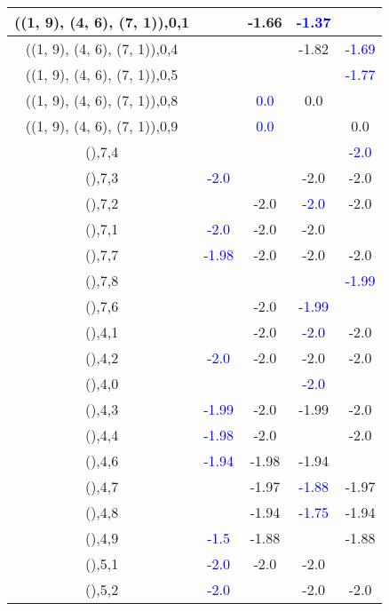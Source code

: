 \documentclass{article}
\begin{document}
\begin{center}
\begin{longtable}{|c|c|c|c|c|}
        	\hline
        	((1, 9), (4, 6), (7, 1)),0,1&&-1.66& \textcolor{blue}{-1.37}&\\
        	\hline
        	((1, 9), (4, 6), (7, 1)),0,4&&&-1.82& \textcolor{blue}{-1.69}\\
        	\hline
        	((1, 9), (4, 6), (7, 1)),0,5&&&& \textcolor{blue}{-1.77}\\
        	\hline
        	((1, 9), (4, 6), (7, 1)),0,8&& \textcolor{blue}{0.0}&0.0&\\
        	\hline
        	((1, 9), (4, 6), (7, 1)),0,9&& \textcolor{blue}{0.0}&&0.0\\
        	\hline
        	(),7,4&&&& \textcolor{blue}{-2.0}\\
        	\hline
        	(),7,3& \textcolor{blue}{-2.0}&&-2.0&-2.0\\
        	\hline
        	(),7,2&&-2.0& \textcolor{blue}{-2.0}&-2.0\\
        	\hline
        	(),7,1& \textcolor{blue}{-2.0}&-2.0&-2.0&\\
        	\hline
        	(),7,7& \textcolor{blue}{-1.98}&-2.0&-2.0&-2.0\\
        	\hline
        	(),7,8&&&& \textcolor{blue}{-1.99}\\
        	\hline
        	(),7,6&&-2.0& \textcolor{blue}{-1.99}&\\
        	\hline
        	(),4,1&&-2.0& \textcolor{blue}{-2.0}&-2.0\\
        	\hline
        	(),4,2& \textcolor{blue}{-2.0}&-2.0&-2.0&-2.0\\
        	\hline
        	(),4,0&&& \textcolor{blue}{-2.0}&\\
        	\hline
        	(),4,3& \textcolor{blue}{-1.99}&-2.0&-1.99&-2.0\\
        	\hline
        	(),4,4& \textcolor{blue}{-1.98}&-2.0&&-2.0\\
        	\hline
        	(),4,6& \textcolor{blue}{-1.94}&-1.98&-1.94&\\
        	\hline
        	(),4,7&&-1.97& \textcolor{blue}{-1.88}&-1.97\\
        	\hline
        	(),4,8&&-1.94& \textcolor{blue}{-1.75}&-1.94\\
        	\hline
        	(),4,9& \textcolor{blue}{-1.5}&-1.88&&-1.88\\
        	\hline
        	(),5,1& \textcolor{blue}{-2.0}&-2.0&-2.0&\\
        	\hline
        	(),5,2& \textcolor{blue}{-2.0}&&-2.0&-2.0\\
        	\hline

\end{longtable}
\end{center}
\end{document}
